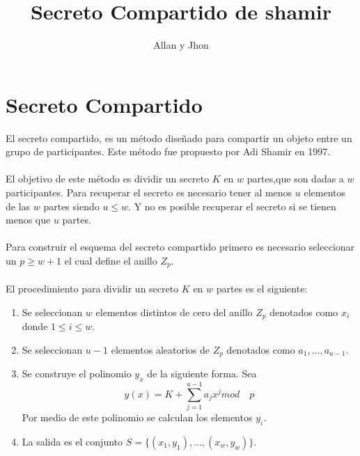 \documentclass[a4paper,10pt]{article}
\title{Secreto Compartido de shamir}
\author{Allan y Jhon}
\begin{document}
\maketitle

\section{Secreto Compartido}
El secreto compartido, es un método dise\~nado para compartir un objeto entre un grupo de participantes. Este método fue propuesto por Adi Shamir en 1997.
\\
\\
El objetivo de este método es dividir un secreto $K$ en $w$ partes,que son dadas a $w$ participantes. Para recuperar el secreto es necesario tener al menos $u$
elementos de las $w$ partes siendo $u \leq w$. Y no es posible recuperar el secreto si se tienen menos que $u$ partes.
\\
\\
Para construir el esquema del secreto compartido primero es necesario seleccionar un $p \geq w+1$ el cual define el anillo $Z_p$.
\\
\\
El procedimiento para dividir un secreto $K$ en $w$ partes es el siguiente:

\begin{enumerate}
 \item Se seleccionan $w$ elementos distintos de cero del anillo $Z_p$ denotados como $x_i$ donde $1 \leq i \leq w$.
 \item Se seleccionan $u-1$ elementos aleatorios de $Z_p$ denotados como $a_1,...,a_{u-1}$.
 \item Se construye el polinomio $y_x$ de la siguiente forma. Sea \begin{equation}
            y(x)=K+\sum_{j=1}^{u-1} a_j x^j mod \quad p
           \end{equation}
           Por medio de este polinomio se calculan los elementos $y_i$.
 \item La salida es el conjunto $S=\{(x_1,y_1),...,(x_w,y_w)\}$.
\end{enumerate}
\end{document}
